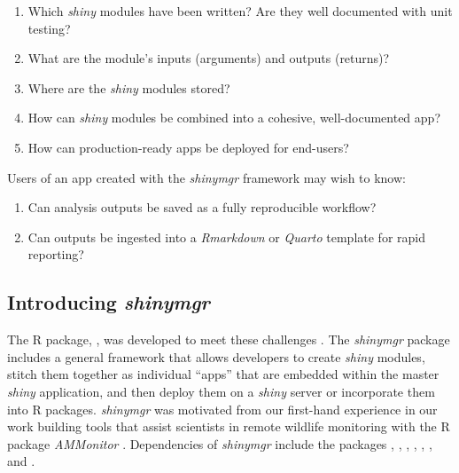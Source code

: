 \begin{enumerate}
\def\labelenumi{\arabic{enumi}.}
\tightlist
\item
  Which \emph{shiny} modules have been written? Are they well documented with unit testing?
\item
  What are the module's inputs (arguments) and outputs (returns)?
\item
  Where are the \emph{shiny} modules stored?
\item
  How can \emph{shiny} modules be combined into a cohesive, well-documented app?
\item
  How can production-ready apps be deployed for end-users?
\end{enumerate}

Users of an app created with the \emph{shinymgr} framework may wish to know:

\begin{enumerate}
\def\labelenumi{\arabic{enumi}.}
\setcounter{enumi}{5}
\tightlist
\item
  Can analysis outputs be saved as a fully reproducible workflow?
\item
  Can outputs be ingested into a \emph{Rmarkdown} or \emph{Quarto} template for rapid reporting?
\end{enumerate}

\subsection{\texorpdfstring{Introducing \emph{shinymgr}}{Introducing shinymgr}}\label{introducing-shinymgr}

The R package, , was developed to meet these challenges \citep{shinymgr_citation}. The \emph{shinymgr} package includes a general framework that allows developers to create \emph{shiny} modules, stitch them together as individual ``apps'' that are embedded within the master \emph{shiny} application, and then deploy them on a \emph{shiny} server or incorporate them into R packages. \emph{shinymgr} was motivated from our first-hand experience in our work building tools that assist scientists in remote wildlife monitoring with the R package \emph{AMMonitor} \citep{balantic2020ammonitor}. Dependencies of \emph{shinymgr} include the packages  \citep{dbi},  \citep{reactable},  \citep{RSQLite},  \citep{renv},  \citep{shiny},  \citep{shinyjs}, and  \citep{shinydashboard}.

